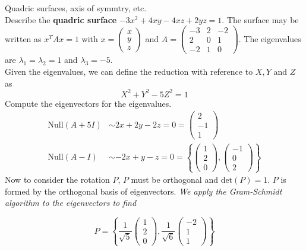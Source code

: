 \documentclass[journal, letterpaper]{IEEEtran}
\begin{document}
    \begin{myboxg}{Quadric surfaces, axis of symmtry, etc.} \\
        Describe the \textbf{quadric surface} $-3x^2 + 4xy - 4xz + 2yz = 1$. The surface may be written as
        $x^TAx = 1$ with $x = \begin{pmatrix}
            x \\ y \\ z
        \end{pmatrix}$ and $A = \begin{pmatrix}
            -3 & 2 & -2 \\ 2 & 0 & 1 \\ -2 & 1 & 0
        \end{pmatrix}$. The eigenvalues are $\lambda_1 = \lambda_2 = 1$ and $\lambda_3 = -5$.
        \newline \\ 
        Given the eigenvalues, we can define the reduction with reference to $X, Y$ and $Z$ as
        $$ X^2 + Y^2 - 5Z^2 = 1$$
        Compute the eigenvectors for the eigenvalues.
        \begin{align*}
            \text{Null}(A + 5I) &\sim 2x + 2y - 2z = 0 = \begin{pmatrix}
                2 \\ -1 \\ 1
            \end{pmatrix} \\
            \text{Null}(A - I) &\sim -2x + y - z = 0 = \left\{\begin{pmatrix}
            1 \\ 2 \\ 0
            \end{pmatrix}, \begin{pmatrix}
            -1 \\ 0 \\ 2
            \end{pmatrix} \right\}
        \end{align*}
        Now to consider the rotation $P$, $P$ must be orthogonal and $\text{det}(P) = 1$. $P$ is formed 
        by the orthogonal basis of eigenvectors. \textit{We apply the Gram-Schmidt algorithm to the eigenvectors
        to find}

        $$ P = \left\{\frac{1}{\sqrt{5}}\begin{pmatrix}
            1 \\ 2 \\ 0
        \end{pmatrix}, \frac{1}{\sqrt{6}}\begin{pmatrix}
            -2 \\ 1 \\ 1
        \end{pmatrix} \right\}$$


\end{myboxg}
\end{document}
